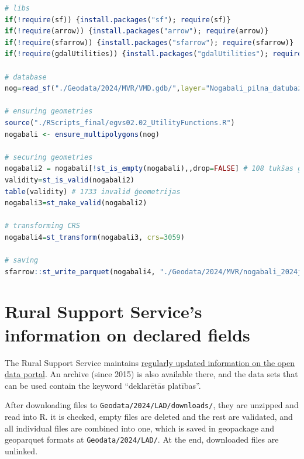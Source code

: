 \documentclass[
]{book}
\newcommand{\passthrough}[1]{#1}
\begin{document}
\begin{lstlisting}[language=R]
# libs
if(!require(sf)) {install.packages("sf"); require(sf)}
if(!require(arrow)) {install.packages("arrow"); require(arrow)}
if(!require(sfarrow)) {install.packages("sfarrow"); require(sfarrow)}
if(!require(gdalUtilities)) {install.packages("gdalUtilities"); require(gdalUtilities)}

# database
nog=read_sf("./Geodata/2024/MVR/VMD.gdb/",layer="Nogabali_pilna_datubaze")

# ensuring geometries
source("./RScripts_final/egvs02.02_UtilityFunctions.R")
nogabali <- ensure_multipolygons(nog)

# securing geometries
nogabali2 = nogabali[!st_is_empty(nogabali),,drop=FALSE] # 108 tukšas ģeometrijas
validity=st_is_valid(nogabali2) 
table(validity) # 1733 invalid ģeometrijas
nogabali3=st_make_valid(nogabali2)

# transforming CRS
nogabali4=st_transform(nogabali3, crs=3059)

# saving
sfarrow::st_write_parquet(nogabali4, "./Geodata/2024/MVR/nogabali_2024janv.parquet")
\end{lstlisting}

\section{Rural Support Service's information on declared fields}\label{Ch04.02}

The Rural Support Service maintains \href{https://data.gov.lv/dati/lv/organization/lad}{regularly updated information on the open
data portal}. An archive (since 2015) is
also available there, and the data sets that can be used contain the keyword ``deklarētās platības''.

After downloading files to \passthrough{\lstinline!Geodata/2024/LAD/downloads/!}, they are unzipped and read into R.
it is checked, empty files are deleted and the rest are validated, and all individual
files are combined into one, which is saved in geopackage and geoparquet formats
at \passthrough{\lstinline!Geodata/2024/LAD/!}. At the end, downloaded files are unlinked.
\end{document}
